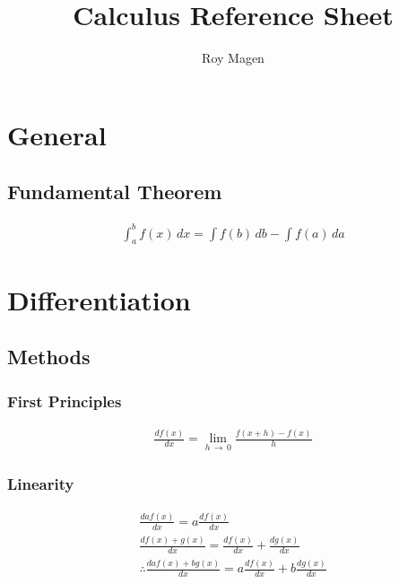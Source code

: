 \documentclass[12pt]{article}
\title{Calculus Reference Sheet}
\author{Roy Magen}
\date{ }
\numberwithin{equation}{subsubsection}
\begin{document}
	\newcommand{\differ}{d}

	\newcommand{\derivative}[2][x]{\frac{\differ #2}{\differ #1}}
	\newcommand{\integral}[2][x]{\int #2\,\differ #1}
	\newcommand{\arccsc}[0]{\,\text{arccsc}\,}
	\newcommand{\arcsec}[0]{\,\text{arcsec}\,}
	\newcommand{\arccot}[0]{\,\text{arccot}\,}

	\begin{titlepage}
	\maketitle
	\end{titlepage}
	
	\tableofcontents
	\pagebreak

	\section{General}
		\subsection{Fundamental Theorem}
			\begin{gather}
				\integral{_a^b f(x)} = \integral[b]{f(b)} - \integral[a]{f(a)}
			\end{gather}
	\section{Differentiation}
		\subsection{Methods}
			\subsubsection{First Principles}
				\begin{gather}
					\derivative{f(x)} = \lim_{h \,\to\, 0} \frac{f(x + h) - f(x)}{h}
				\end{gather}
			\subsubsection{Linearity}
				\begin{gather}
					\derivative{af(x)} = a\derivative{f(x)} \\
					\derivative{f(x) + g(x)} = \derivative{f(x)} +
					\derivative{g(x)} \\
					\therefore \derivative{af(x) + bg(x)} = a\derivative{f(x)}
					+ b\derivative{g(x)}
				\end{gather}
\end{document}
